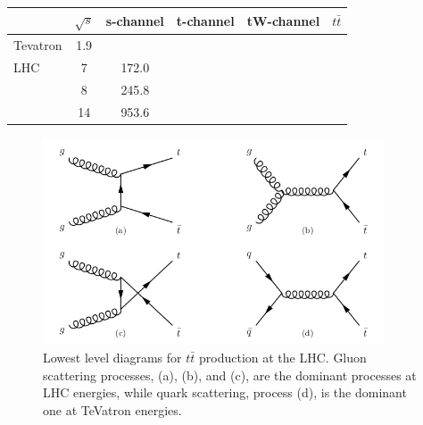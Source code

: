 \begin{table} \label{tab-ttbarcrosssections}
\begin{center}
\begin{tabular}{lccccc}
\hline
\hline
& \textbf{$\sqrt{s}$} & \textbf{s-channel} & \textbf{t-channel} & \textbf{tW-channel} & \textbf{$t\bar{t}$} \\
\hline
Tevatron & 1.9 &  & & & \\
LHC & 7 & 172.0 &  & & \\ 
 & 8 & 245.8 & & &\\
 & 14 & 953.6 & & & \\
\hline
\hline
\end{tabular}
\caption{\cite{Czakon:2013goa}}
\end{center}
\end{table}

\begin{figure} \label{fig-ttbarProductionLHC}
\begin{center}
\includegraphics[width=0.9\textwidth]{Figures/ttbarProductionLHC.png}
\caption{Lowest level diagrams for $t\bar{t}$ production at the LHC. Gluon scattering processes, {(a)}, {(b)}, and {(c)}, are the dominant processes at LHC energies, while quark scattering, process {(d)}, is the dominant one at TeVatron energies. \cite{SergeyThesis}}
\end{center}
\end{figure}

